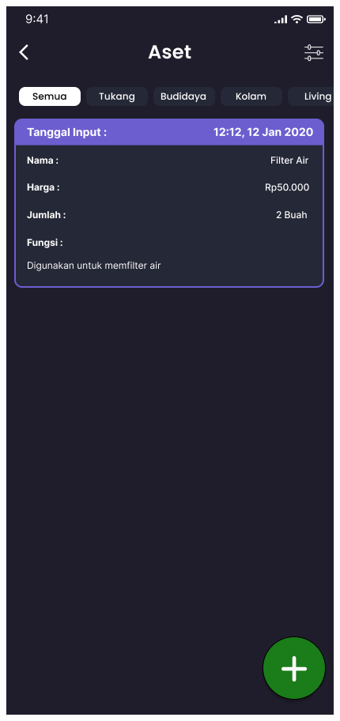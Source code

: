 \begin{enumerate}
\begin{enumerate}
		\begin{figure}[H]
			\hspace{.15\linewidth}
			  \includegraphics[width=\linewidth]{gambar/sprint1/mockup_list_aset.png}

\end{figure}
\end{enumerate}
\end{enumerate}
